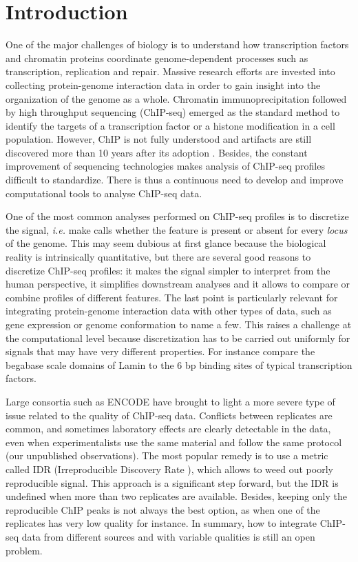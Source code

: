 \documentclass{bioinfo}
\begin{document}
\section{Introduction}
One of the major challenges of biology is to understand how transcription
factors and chromatin proteins coordinate genome-dependent processes 
such as transcription, replication and repair. Massive research efforts
are invested into collecting protein-genome interaction data in order
to gain insight into the organization of the genome as a whole. Chromatin
immunoprecipitation followed by high throughput sequencing (ChIP-seq)
emerged as the standard method to identify the targets of a transcription
factor or a histone modification in a cell population. However, ChIP is not
fully understood and artifacts are still discovered more than 10 years after
its adoption \citep{pmid24349523, pmid24173036}. Besides, the constant
improvement of sequencing technologies makes analysis of ChIP-seq profiles
difficult to standardize. There is thus a continuous need to develop and
improve computational tools to analyse ChIP-seq data.

One of the most common analyses performed on ChIP-seq profiles is to
discretize the signal, \textit{i.e.} make calls whether the feature is
present or absent for every \textit{locus} of the genome. This may seem
dubious at first glance because the biological reality is intrinsically
quantitative, but there are several good reasons to discretize ChIP-seq
profiles: it makes the signal simpler to interpret from the human
perspective, it simplifies downstream analyses and it allows to compare or
combine profiles of different features. The last point is particularly
relevant for integrating protein-genome interaction data with 
other types of data, such as gene expression or genome conformation to
name a few. This raises a challenge at the computational level because
discretization has to be carried out uniformly for signals that may
have very different properties. For instance compare the begabase scale
domains of Lamin \citep{pmid18463634} to the 6 bp binding sites of typical
transcription factors.

Large consortia such as ENCODE have brought to light a more severe type
of issue related to the quality of ChIP-seq data. Conflicts between
replicates are common, and
sometimes laboratory effects are clearly detectable in the data,
even when experimentalists use the same material and follow the same
protocol (our unpublished observations). The most popular remedy is to
use a metric called IDR (Irreproducible Discovery Rate \cite{li2011}),
which allows to weed
out poorly reproducible signal. This approach is a significant step
forward, but the IDR is undefined when more than two replicates are
available. Besides, keeping only the reproducible ChIP peaks is not always
the best option, as when one of the replicates has very low quality for
instance. In summary, how to integrate ChIP-seq data from different sources
and with variable qualities is still an open problem.
\end{document}
